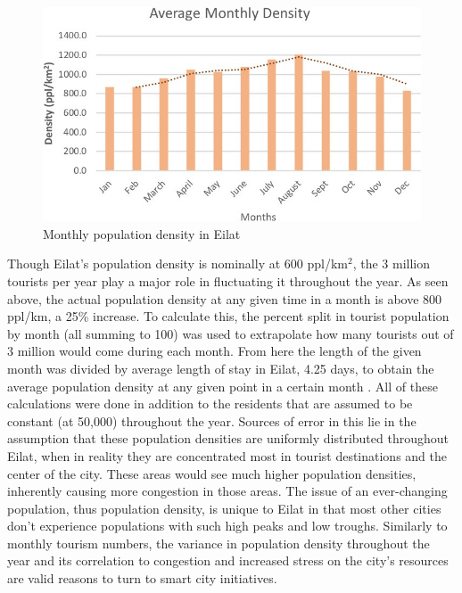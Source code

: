 \documentclass[12pt]{article}                               %
\begin{document}
\begin{figure}[H]
    \centering
    \includegraphics[width=1\textwidth]{images/monthly_population_density.jpg}
    \caption{Monthly population density in Eilat}
    \label{img:monthly_population_density}
\end{figure}

Though Eilat's population density is nominally at 600 ppl/km$^2$, the 3 million tourists per year play a major role in fluctuating it throughout the year. As seen above, the actual population density at any given time in a month is above 800 ppl/km, a 25\% increase. To calculate this, the percent split in tourist population by month (all summing to 100) was used to extrapolate how many tourists out of 3 million would come during each month. From here the length of the given month was divided by average length of stay in Eilat, 4.25 days, to obtain the average population density at any given point in a certain month \cite{IsraelMinistryofTourism2017}. All of these calculations were done in addition to the residents that are assumed to be constant (at 50,000) throughout the year. Sources of error in this lie in the assumption that these population densities are uniformly distributed throughout Eilat, when in reality they are concentrated most in tourist destinations and the center of the city. These areas would see much higher population densities, inherently causing more congestion in those areas. The issue of an ever-changing population, thus population density, is unique to Eilat in that most other cities don't experience populations with such high peaks and low troughs. Similarly to monthly tourism numbers, the variance in population density throughout the year and its correlation to congestion and increased stress on the city's resources are valid reasons to turn to smart city initiatives.
\end{document}
